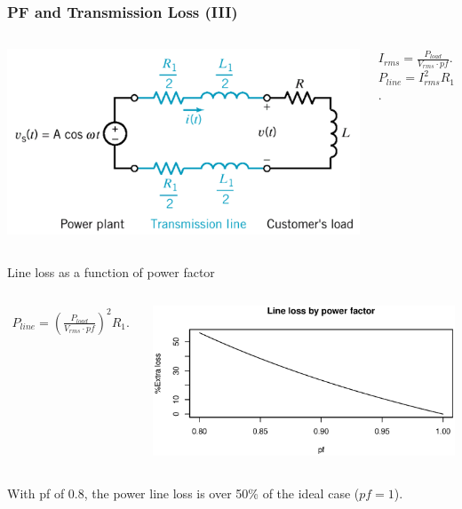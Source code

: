 \documentclass{beamer}
\begin{document}
\begin{frame}[fragile]
\frametitle{PF and Transmission Loss (III)}

\begin{columns}[c]
\includegraphics[width=\textwidth]{src/TransmissionLinesCCT.png}

$I_{rms} = \frac{P_{load}}{V_{rms} \cdot pf}$.
\\
$P_{line} = I_{rms}^2 R_1$.

\end{columns}
\vspace{0.5cm}

Line loss as a function of power factor

\begin{columns}[c]
\begin{eqnarray}
P_{line} = \left( \frac{P_{load}}{V_{rms} \cdot pf} \right)^2 R_1
\nonumber .
\end{eqnarray}

\includegraphics[width=\textwidth]{src/Pline_pf.eps}
\end{columns}

With pf of 0.8, the power line loss is over 50\% of the ideal case ($pf = 1$).





\end{frame}
\end{document}
